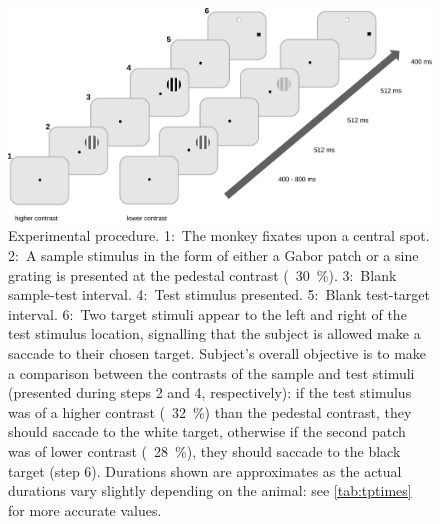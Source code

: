\begin{figure}[htbp]
\begin{center}
\includegraphics[width=\linewidth]{figs/info/PLtask1.pdf}
\end{center}
\caption{
Experimental procedure.
1:~The monkey fixates upon a central spot.
2:~A sample stimulus in the form of either a Gabor patch or a sine grating is presented at the pedestal contrast (\eg{}~\SI{30}{\percent}).
3:~Blank sample-test interval.
4:~Test stimulus presented.
5:~Blank test-target interval.
6:~Two target stimuli appear to the left and right of the test stimulus location, signalling that the subject is allowed make a saccade to their chosen target.
Subject's overall objective is to make a comparison between the contrasts of the sample and test stimuli (presented during steps 2 and 4, respectively): if the test stimulus was of a higher contrast (\eg{}~\SI{32}{\percent}) than the pedestal contrast, they should saccade to the white target, otherwise if the second patch was of lower contrast (\eg{}~\SI{28}{\percent}), they should saccade to the black target (step 6).
Durations shown are approximates as the actual durations vary slightly depending on the animal: see \autoref{tab:tptimes} for more accurate values.}
\label{fig:pltask1}
\end{figure}

